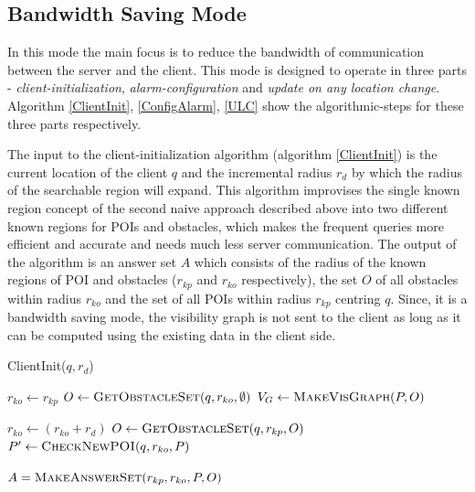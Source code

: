 \documentclass{sig-alternate}
\begin{document}
\subsection{Bandwidth Saving Mode}
In this mode the main focus is to reduce the bandwidth of communication between the server and the client. This mode is designed to operate in three parts - \textit{client-initialization}, \textit{alarm-configuration} and \textit{update on any location change}. Algorithm \ref{ClientInit}, \ref{ConfigAlarm}, \ref{ULC} show the algorithmic-steps for these three parts respectively.

The input to the client-initialization algorithm (algorithm \ref{ClientInit}) is the current location of the client $q$ and the incremental radius $r_d$ by which the radius of the searchable region will expand. This algorithm improvises the single known region concept of the second naive approach described above into two different known regions for POIs and obstacles, which makes the frequent queries more efficient and accurate and needs much less server communication. The output of the algorithm is an answer set $A$ which consists of the radius of the known regions of POI and obstacles ($r_{kp}$ and $r_{ko}$ respectively), the set $O$ of all obstacles within radius $r_{ko}$ and the set of all POIs within radius $r_{kp}$ centring $q$. Since, it is a bandwidth saving mode, the visibility graph is not sent to the client as long as it can be computed using the existing data in the client side.

\begin{algorithm}
\caption{ClientInit($q,r_d$)}
\label{ClientInit}

    
	 $r_{ko} \gets r_{kp} $ \; %
	 $O \gets \textsc{GetObstacleSet}(q, r_{ko}, \emptyset)$ \;
	 $V_G \gets \textsc{MakeVisGraph}(P, O)$ \;
	  { 
		$r_{ko} \gets (r_{ko} + r_d)$ \;
		$O \gets \textsc{GetObstacleSet}(q, r_{kp}, O)$ \;
		$P' \gets \textsc{CheckNewPOI}(q, r_{ko}, P)$ \;
		
	} \label{while}
	
	 \Return $A = \textsc{MakeAnswerSet}(r_{kp}, r_{ko}, P, O)$ 
\end{algorithm}
\end{document}
